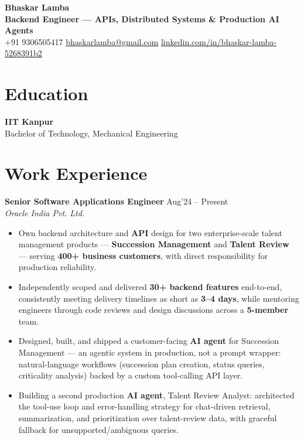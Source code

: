 \documentclass[10pt,a4paper]{article}
\newcommand{\resumeItem}[1]{\item[\textcolor{primary}{\textbullet}] #1}
\begin{document}
\begin{center}
    {\LARGE\bfseries Bhaskar Lamba}\\[4pt]
    {\small\color{primary}\bfseries Backend Engineer --- APIs, Distributed Systems \& Production AI Agents}\\[3pt]
    \small
    +91 9306505417 \quad\textbar\quad
    \href{mailto:bhaskarlamba@gmail.com}{bhaskarlamba@gmail.com} \quad\textbar\quad
    \href{https://www.linkedin.com/in/bhaskar-lamba-5268391b2/}{linkedin.com/in/bhaskar-lamba-5268391b2}
\end{center}
\vspace{6pt}

\section{Education}
\small
\textbf{IIT Kanpur} \hfill {}\\
Bachelor of Technology, Mechanical Engineering

\section{Work Experience}
\small

\textbf{Senior Software Applications Engineer} \hfill Aug'24 -- Present\\
\textit{Oracle India Pvt. Ltd.}
\begin{itemize}[leftmargin=1.05em, nosep, topsep=0pt, itemsep=0pt, parsep=0pt]
    \resumeItem{Own backend architecture and \textbf{API} design for two enterprise-scale talent management products --- \textbf{Succession Management} and \textbf{Talent Review} --- serving \textbf{400+ business customers}, with direct responsibility for production reliability.}
    \resumeItem{Independently scoped and delivered \textbf{30+ backend features} end-to-end, consistently meeting delivery timelines as short as \textbf{3--4 days}, while mentoring engineers through code reviews and design discussions across a \textbf{5-member} team.}
    \resumeItem{Designed, built, and shipped a customer-facing \textbf{AI agent} for Succession Management --- an agentic system in production, not a prompt wrapper: natural-language workflows (succession plan creation, status queries, criticality analysis) backed by a custom tool-calling API layer.}
    \resumeItem{Building a second production \textbf{AI agent}, Talent Review Analyst: architected the tool-use loop and error-handling strategy for chat-driven retrieval, summarization, and prioritization over talent-review data, with graceful fallback for unsupported/ambiguous queries.}
\end{itemize}
\end{document}
